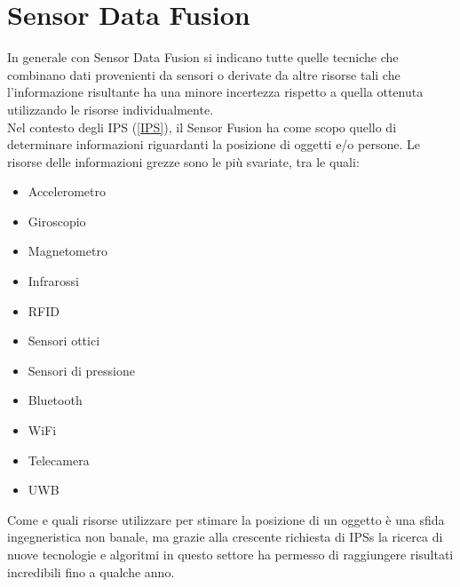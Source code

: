 \section{Sensor Data Fusion}

In generale con Sensor Data Fusion si indicano tutte quelle tecniche che \cite{sensorfusion} combinano dati provenienti da sensori o derivate da altre risorse tali che l'informazione risultante ha una minore incertezza rispetto a quella ottenuta utilizzando le risorse individualmente. \\
Nel contesto degli IPS (\ref{IPS}), il Sensor Fusion ha come scopo quello di determinare informazioni riguardanti la posizione di oggetti e/o persone. Le risorse delle informazioni grezze sono le più svariate, tra le quali:
\begin{itemize}
	\item Accelerometro
	\item Giroscopio
	\item Magnetometro
	\item Infrarossi
	\item RFID 
	\item Sensori ottici
	\item Sensori di pressione
	\item Bluetooth
	\item WiFi
	\item Telecamera
	\item UWB
\end{itemize}

Come e quali risorse utilizzare per stimare la posizione di un oggetto è una sfida ingegneristica non banale, ma grazie alla crescente richiesta di IPSs la ricerca di nuove tecnologie e algoritmi in questo settore ha permesso di raggiungere risultati incredibili fino a qualche anno. \\







